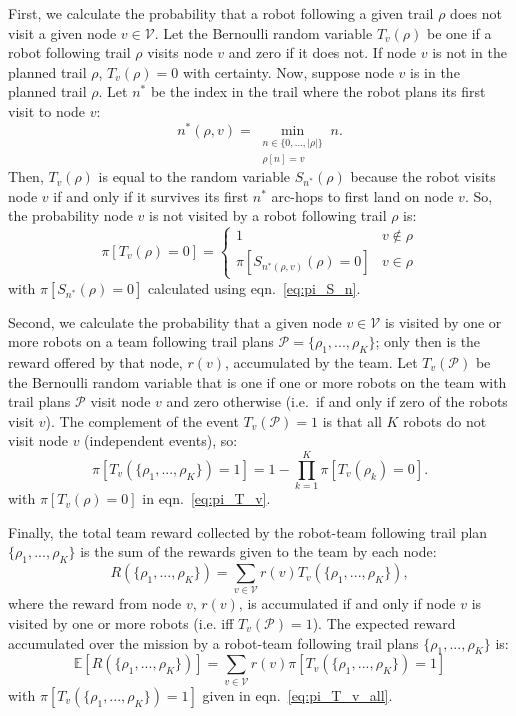 \documentclass[11pt, oneside]{article}
\begin{document}
First, we calculate the probability that a robot following a given trail $\rho$ does not visit a given node $v\in \mathcal{V}$.
Let the Bernoulli random variable $T_v(\rho)$ be one if a robot following trail $\rho$ visits node $v$ and zero if it does not.
If node $v$ is not in the planned trail $\rho$, $T_v(\rho)=0$ with certainty. 
Now, suppose node $v$ is in the planned trail $\rho$. Let $n^*$ be the index in the trail where the robot plans its first visit to node $v$:
\begin{equation}
n^*(\rho, v) = \min_{
	\substack{n \in \{0, ..., \lvert \rho \rvert\} \\ \rho[n] = v}
} n.
\end{equation}
Then, $T_v(\rho)$ is equal to the random variable $S_{n^*}(\rho)$ because the robot visits node $v$ if and only if it survives its first $n^*$ arc-hops to first land on node $v$. 
So, the probability node $v$ is not visited by a robot following trail $\rho$ is:
\begin{equation}
	\pi[T_v(\rho) = 0] = 
	\begin{cases}
		1 & v\notin \rho\\
		 \pi [S_{n^*(\rho, v)}(\rho)=0 ] & v \in \rho
	\end{cases}
	 \label{eq:pi_T_v}
\end{equation}
with $\pi[S_{n^*}(\rho)=0]$ calculated using eqn.~\ref{eq:pi_S_n}.

Second, we calculate the probability that a given node $v\in\mathcal{V}$ is visited by one or more robots on a team following trail plans $\mathcal{P}=\{\rho_1, ..., \rho_K\}$; only then is the reward offered by that node, $r(v)$, accumulated by the team.
Let $T_v(\mathcal{P})$ be the Bernoulli random variable that is one if one or more robots on the team with trail plans $\mathcal{P}$ visit node $v$ and zero otherwise (i.e.\ if and only if zero of the robots visit $v$).
The complement of the event $T_v(\mathcal{P})=1$ is that all $K$ robots do not visit node $v$ (independent events), so:
\begin{equation}
	\pi [T_v( \{\rho_1, ..., \rho_K\} ) = 1] = 
	1 - \prod_{k=1}^K \pi[T_v(\rho_k)=0].
	\label{eq:pi_T_v_all}
\end{equation} 
with $\pi[T_v(\rho) = 0]$ in eqn.~\ref{eq:pi_T_v}.

Finally, the total team reward collected by the robot-team following trail plan $\{\rho_1, ..., \rho_K\}$ is the sum of the rewards given to the team by each node:
\begin{equation}
R(\{\rho_1,...,\rho_K\}) = \sum_{v\in\mathcal{V}} r(v)  T_v(\{\rho_1, ..., \rho_K\}),
\end{equation} where the reward from node $v$, $r(v)$, is accumulated if and only if node $v$ is visited by one or more robots (i.e. iff $T_v(\mathcal{P})=1$).
The expected reward accumulated over the mission by a robot-team following trail plans $\{\rho_1, ..., \rho_K\}$ is:
\begin{equation}
	\mathbb{E}[R(\{\rho_1,...,\rho_K\})]= \sum_{v\in\mathcal{V}} r(v) \pi[T_v(\{\rho_1, ..., \rho_K\}) = 1] \label{eq:formula_obj1}
\end{equation}
with $ \pi[T_v(\{\rho_1, ..., \rho_K\}) = 1]$ given in eqn.~\ref{eq:pi_T_v_all}.
\end{document}
